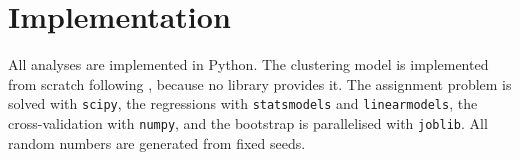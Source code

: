 \section{Implementation}
\label{sec:method-implementation}

All analyses are implemented in Python. The clustering model is implemented from scratch following , because no library provides it. The assignment problem is solved with \texttt{scipy}, the regressions with \texttt{statsmodels} and \texttt{linearmodels}, the cross-validation with \texttt{numpy}, and the bootstrap is parallelised with \texttt{joblib}. All random numbers are generated from fixed seeds.
